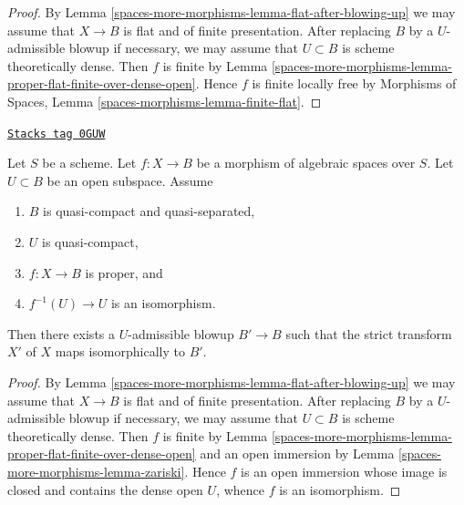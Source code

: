 \begin{proof}
By Lemma \ref{spaces-more-morphisms-lemma-flat-after-blowing-up} we may assume that
$X \to B$ is flat and of finite presentation. After replacing
$B$ by a $U$-admissible blowup if necessary, we may assume
that $U \subset B$ is scheme theoretically dense. Then $f$ is
finite by Lemma \ref{spaces-more-morphisms-lemma-proper-flat-finite-over-dense-open}.
Hence $f$ is finite locally free by
Morphisms of Spaces, Lemma \ref{spaces-morphisms-lemma-finite-flat}.
\end{proof}

\begin{lemma}
\label{spaces-more-morphisms-lemma-isomorphism-after-blowing-up}
\href{https://stacks.math.columbia.edu/tag/0GUW}{\texttt{Stacks tag 0GUW}}

Let $S$ be a scheme. Let $f : X \to B$ be a morphism of algebraic
spaces over $S$. Let $U \subset B$ be an open subspace. Assume
\begin{enumerate}
\item $B$ is quasi-compact and quasi-separated,
\item $U$ is quasi-compact,
\item $f : X \to B$ is proper, and
\item $f^{-1}(U) \to U$ is an isomorphism.
\end{enumerate}
Then there exists a $U$-admissible blowup $B' \to B$ such that
the strict transform $X'$ of $X$ maps isomorphically to $B'$.
\end{lemma}

\begin{proof}
By Lemma \ref{spaces-more-morphisms-lemma-flat-after-blowing-up} we may assume that
$X \to B$ is flat and of finite presentation. After replacing
$B$ by a $U$-admissible blowup if necessary, we may assume
that $U \subset B$ is scheme theoretically dense. Then $f$ is
finite by Lemma \ref{spaces-more-morphisms-lemma-proper-flat-finite-over-dense-open}
and an open immersion by Lemma \ref{spaces-more-morphisms-lemma-zariski}. Hence $f$
is an open immersion whose image is closed and contains the
dense open $U$, whence $f$ is an isomorphism.
\end{proof}

